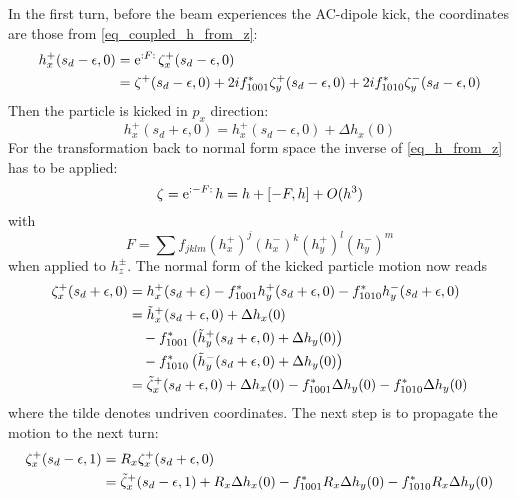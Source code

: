 In the first turn, before the beam experiences the AC-dipole kick, the coordinates are those from
\eqref{eq_coupled_h_from_z}:
%
\begin{align}
  h_x^+(s_d-\epsilon, 0) &=  \text{e}^{{:}F{:}\,} \zeta_x^+(s_d-\epsilon, 0)\notag \\
  &=  \zeta^+(s_d-\epsilon,0)
    + 2if_{1001}^*\zeta_y^+(s_d-\epsilon, 0)
    + 2if_{1010}^*\zeta_y^-(s_d-\epsilon,0)
\end{align}
%
Then the particle is kicked in $p_x$ direction:
%
\begin{equation}
  h_x^+(s_d+\epsilon, 0) =  h_x^+(s_d - \epsilon,0) + \Delta h_x(0)
\end{equation}
%
For the transformation back to normal form space the inverse of \eqref{eq_h_from_z} has to be applied:
%
\begin{equation}
  \zeta = \text{e}^{{:}-F{:}\,} h = h + [-F,h] + O(h^3)
  \label{eq_coupled_h_after_kick}
\end{equation}
%
with
%
\begin{equation}
  F = \sum f_{jklm}\left( h_x^+ \right)^j \left( h_x^- \right)^k \left( h_y^+ \right)^l \left( h_y^- \right)^m
\end{equation}
%
when applied to $h_z^\pm$.
The normal form of the kicked particle motion now reads
%
\begin{align}
    \zeta_x^+(s_d+\epsilon, 0)
        &= h_x^+(s_d+\epsilon)
            - f_{1001}^* h_y^+(s_d+\epsilon, 0)
            - f_{1010}^* h_y^-(s_d+\epsilon, 0)
    \notag\\
        &= \tilde{h}_x^+(s_d+\epsilon,0) + \Delta h_x(0)
            \notag \\ &\quad - f_{1001}^* \left(\tilde{h}_y^+(s_d+\epsilon, 0) + \Delta h_y(0) \right)
            \notag \\ &\quad - f_{1010}^* \left(\tilde{h}_y^-(s_d+\epsilon, 0) + \Delta h_y(0) \right)
    \notag \\
        &= \tilde{\zeta}_x^+(s_d+\epsilon, 0) + \Delta h_x(0)
            - f_{1001}^* \Delta h_y(0)
            - f_{1010}^* \Delta h_y(0)
\end{align}
%
where the tilde denotes undriven coordinates. The next step is to propagate the motion to the next
turn:
%
\begin{align}
    \zeta_x^+(s_d-\epsilon, 1) &= R_x\zeta_x^+(s_d+\epsilon, 0) \notag \\
        &= \tilde{\zeta}_x^+(s_d-\epsilon, 1) + R_x\Delta h_x(0)
            - f_{1001}^* R_x\Delta h_y(0)
            - f_{1010}^* R_x\Delta h_y(0)
\end{align}
